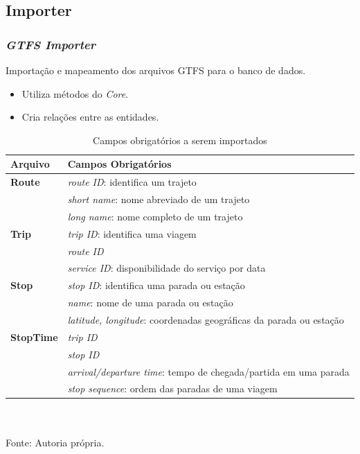 \subsection{Importer}
\frame
{
\frametitle{\emph{GTFS Importer}}
Importação e mapeamento dos arquivos GTFS para o banco de dados.
\begin{itemize}
\item Utiliza métodos do \emph{Core}.
\item Cria relações entre as entidades.
\end{itemize}


\begin{table}
	\tiny
	\caption{Campos obrigatórios a serem importados}
	\begin{tabular}{ll}
		\hline
		\textbf{Arquivo} & \textbf{Campos Obrigatórios} \\
		\hline
		\textbf{Route} & \emph{route ID}: identifica um trajeto \\
				    & \emph{short name}: nome abreviado de um trajeto \\
				    & \emph{long name}: nome completo de um trajeto \\
		\textbf{Trip} & \emph{trip ID}: identifica uma viagem \\ 
				& \emph{route ID} \\ 
				& \emph{service ID}: disponibilidade do serviço por data \\
		\textbf{Stop} & \emph{stop ID}: identifica uma parada ou estação \\
				 & \emph{name}: nome de uma parada ou estação \\
				 & \emph{latitude, longitude}: coordenadas geográficas da parada ou estação \\
		\textbf{StopTime} & \emph{trip ID} \\
				         & \emph{stop ID} \\
				         & \emph{arrival/departure time}: tempo de chegada/partida em uma parada \\
				         & \emph{stop sequence}: ordem das paradas de uma viagem \\
		\hline
	\end{tabular}
	\\ ~ \\
	\tiny
	Fonte: Autoria própria.
\end{table}
}

